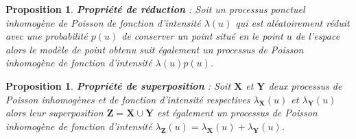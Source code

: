 \documentclass[12pt]{article}
\newtheorem{prop1}[thm1]{Proposition}
\begin{document}
\begin{prop1}
    \textbf{Propriété de réduction} : Soit un processus ponctuel inhomogène de Poisson de fonction d'intensité $\lambda(u)$ qui est aléatoirement réduit avec une probabilité $p(u)$ de conserver un point situé en le point $u$ de l'espace alors le modèle de point obtenu suit également un processus de Poisson inhomogène de fonction d'intensité $\lambda(u)p(u)$.
\end{prop1}

\begin{prop1}
    \textbf{Propriété de superposition} : Soit $\textbf{X}$ et $\textbf{Y}$ deux processus de Poisson inhomogènes et de fonction d'intensité respectives $\lambda_{\textbf{X}}(u)$ et $\lambda_{\textbf{Y}}(u)$ alors leur superposition $\textbf{Z} = \textbf{X} \cup \textbf{Y}$ est également un processus de Poisson inhomogène de fonction d'intensité $\lambda_{\textbf{Z}}(u) = \lambda_{\textbf{X}}(u) + \lambda_{\textbf{Y}}(u)$.
\end{prop1}
\end{document}
